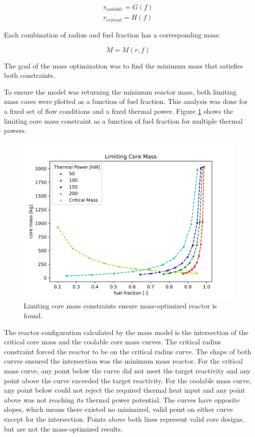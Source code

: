 \begin{align}
    r_{coolable} = G(f) \\
    r_{critical} = H(f)
\end{align}

Each combination of radius and fuel fraction has a corresponding mass:

\begin{equation}
    M = M(r, f)
\end{equation}

The goal of the mass optimization was to find the minimum mass that satisfies
both constraints.

To ensure the model was returning the minimum reactor mass, both limiting mass
cases were plotted as a function of fuel fraction. This analysis was done for a
fixed set of flow conditions and a fixed thermal power. Figure
\ref{fig:limiting_core_mass} shows the limiting core mass constraint as a
function of fuel fraction for multiple thermal powers.

\begin{figure}[h]
    \centering
    \includegraphics[width=5in]{../images/limiting_core_mass.png}
\caption{Limiting core mass constraints ensure mass-optimized reactor is found.}
\label{fig:limiting_core_mass}
\end{figure}

The reactor configuration calculated by the mass model is the intersection of
the critical core mass and the coolable core mass curves. The critical radius
constraint forced the reactor to be on the critical radius curve. The shape of
both curves ensured the intersection was the minimum mass reactor. For the
critical mass curve, any point below the curve did not meet the target
reactivity and any point above the curve exceeded the target reactivity. For the
coolable mass curve, any point below could not reject the required thermal heat
input and any point above was not reaching its thermal power potential. The
curves have opposite slopes, which means there existed no minimized, valid point on either
curve except for the intersection. Points above both lines represent valid
core designs, but are not the mass-optimized results.

